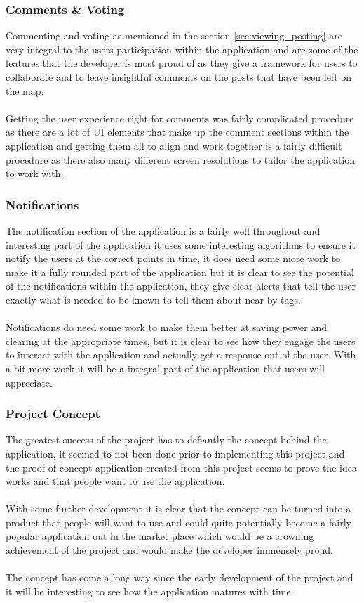 \subsubsection{Comments \& Voting}

Commenting and voting as mentioned in the section \ref{sec:viewing_posting} are very integral to the users participation within the application and are some of the features that the developer is most proud of as they give a framework for users to collaborate and to leave insightful comments on the posts that have been left on the map.\\
\\
Getting the user experience right for comments was fairly complicated procedure as there are a lot of UI elements that make up the comment sections within the application and getting them all to align and work together is a fairly difficult procedure as there also many different screen resolutions to tailor the application to work with.

\subsubsection{Notifications}

The notification section of the application is a fairly well throughout and interesting part of the application it uses some interesting algorithms to ensure it notify the users at the correct points in time, it does need some more work to make it a fully rounded part of the application but it is clear to see the potential of the notifications within the application, they give clear alerts that tell the user exactly what is needed to be known to tell them about near by tags.\\
\\
Notifications do need some work to make them better at saving power and clearing at the appropriate times, but it is clear to see how they engage the users to interact with the application and actually get a response out of the user. With a bit more work it will be a integral part of the application that users will appreciate.

\subsubsection{Project Concept}

The greatest success of the project has to defiantly the concept behind the application, it seemed to not been done prior to implementing this project and the proof of concept application created from this project seems to prove the idea works and that people want to use the application.\\
\\
With some further development it is clear that the concept can be turned into a product that people will want to use and could quite potentially become a fairly popular application out in the market place which would be a crowning achievement of the project and would make the developer immensely proud.\\
\\
The concept has come a long way since the early development of the project and it will be interesting to see how the application matures with time.

